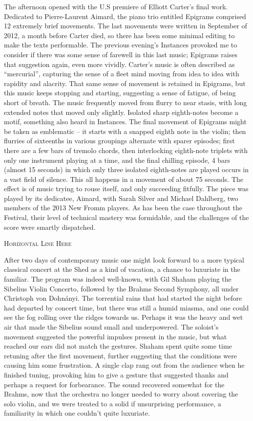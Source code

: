 The afternoon opened with the U.S premiere of Elliott Carter’s final work. Dedicated to Pierre-Laurent Aimard, the piano trio entitled Epigrams comprised 12 extremely brief movements. The last movements were written in September of 2012, a month before Carter died, so there has been some minimal editing to make the texts performable. The previous evening’s Instances provoked me to consider if there was some sense of farewell in this last music; Epigrams raises that suggestion again, even more vividly. Carter’s music is often described as “mercurial”, capturing the sense of a fleet mind moving from idea to idea with rapidity and alacrity. That same sense of movement is retained in Epigrams, but this music keeps stopping and starting, suggesting a sense of fatigue, of being short of breath. The music frequently moved from flurry to near stasis, with long extended notes that moved only slightly. Isolated sharp eighth-notes become a motif, something also heard in Instances. The final movement of Epigrams might be taken as emblematic – it starts with a snapped eighth note in the violin; then flurries of sixteenths in various groupings alternate with sparer episodes; first there are a few bars of tremolo chords, then interlocking eighth-note triplets with only one instrument playing at a time, and the final chilling episode, 4 bars (almost 15 seconds) in which only three isolated eighth-notes are played occurs in a vast field of silence. This all happens in a movement of about 75 seconds. The effect is of music trying to rouse itself, and only succeeding fitfully. The piece was played by its dedicatee, Aimard, with Sarah Silver and Michael Dahlberg, two members of the 2013 New Fromm players. As has been the case throughout the Festival, their level of technical mastery was formidable, and the challenges of the score were smartly dispatched.

\textsc{Horizontal Line Here}

After two days of contemporary music one might look forward to a more typical classical concert at the Shed as a kind of vacation, a chance to luxuriate in the familiar. The program was indeed well-known, with Gil Shaham playing the Sibelius Violin Concerto, followed by the Brahms Second Symphony, all under Christoph von Dohnányi. The torrential rains that had started the night before had departed by concert time, but there was still a humid miasma, and one could see the fog rolling over the ridges towards us. Perhaps it was the heavy and wet air that made the Sibelius sound small and underpowered. The soloist’s movement suggested the powerful impulses present in the music, but what reached our ears did not match the gestures. Shaham spent quite some time retuning after the first movement, further suggesting that the conditions were causing him some frustration. A single clap rang out from the audience when he finished tuning, provoking him to give a gesture that suggested thanks and perhaps a request for forbearance. The sound recovered somewhat for the Brahms, now that the orchestra no longer needed to worry about covering the solo violin, and we were treated to a solid if unsurprising performance, a familiarity in which one couldn’t quite luxuriate.